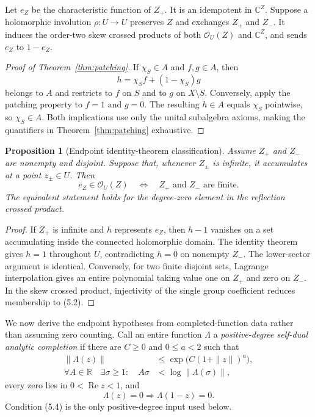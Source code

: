 \documentclass[11pt,reqno]{amsart}
\newtheorem{proposition}[theorem]{Proposition}
\newcommand{\C}{\mathbb C}
\newcommand{\R}{\mathbb R}
\newcommand{\re}{\operatorname{Re}}
\newcommand{\cO}{\mathcal O}
\begin{document}
Let $e_Z$ be the characteristic function of $Z_+$.  It is an idempotent in $\C^Z$.  Suppose a
holomorphic involution $\rho:U\to U$ preserves $Z$ and exchanges $Z_+$ and $Z_-$.  It induces the
order-two skew crossed products of both $\cO_U(Z)$ and $\C^Z$, and sends $e_Z$ to $1-e_Z$.

\begin{proof}[Proof of Theorem~\ref{thm:patching}]
If $\chi_S\in A$ and $f,g\in A$, then
\[
                  h=\chi_Sf+(1-\chi_S)g
\]
belongs to $A$ and restricts to $f$ on $S$ and to $g$ on $X\setminus S$.  Conversely, apply the
patching property to $f=1$ and $g=0$.  The resulting $h\in A$ equals $\chi_S$ pointwise, so
$\chi_S\in A$.  Both implications use only the unital subalgebra axioms, making the quantifiers in
Theorem~\ref{thm:patching} exhaustive.
\end{proof}

\begin{proposition}[Endpoint identity-theorem classification]\label{prop:endpoint}
Assume $Z_+$ and $Z_-$ are nonempty and disjoint.  Suppose that, whenever $Z_\pm$ is infinite, it
accumulates at a point $z_\pm\in U$.  Then
\[
 e_Z\in\cO_U(Z)\quad\Longleftrightarrow\quad
 Z_+\text{ and }Z_-\text{ are finite}.               \tag{5.2}
\]
The equivalent statement holds for the degree-zero element in the reflection crossed product.
\end{proposition}

\begin{proof}
If $Z_+$ is infinite and $h$ represents $e_Z$, then $h-1$ vanishes on a set accumulating inside
the connected holomorphic domain.  The identity theorem gives $h=1$ throughout $U$, contradicting
$h=0$ on nonempty $Z_-$.  The lower-sector argument is identical.  Conversely, for two finite
disjoint sets, Lagrange interpolation gives an entire polynomial taking value one on $Z_+$ and
zero on $Z_-$.  In the skew crossed product, injectivity of the single group coefficient reduces
membership to (5.2).
\end{proof}

We now derive the endpoint hypotheses from completed-function data rather than assuming zero
counting.  Call an entire function $\Lambda$ a \emph{positive-degree self-dual analytic
completion} if there are $C\ge0$ and $0\le a<2$ such that
\begin{align}
 \|\Lambda(z)\|&\le \exp\bigl(C(1+\|z\|)^a\bigr),       \tag{5.3}\\
 \forall A\in\R\quad\exists\sigma\ge1:
 \quad A\sigma&<\log\|\Lambda(\sigma)\|,               \tag{5.4}
\end{align}
every zero lies in $0<\re z<1$, and
\[
             \Lambda(z)=0\Longrightarrow\Lambda(1-z)=0. \tag{5.5}
\]
Condition (5.4) is the only positive-degree input used below.
\end{document}
